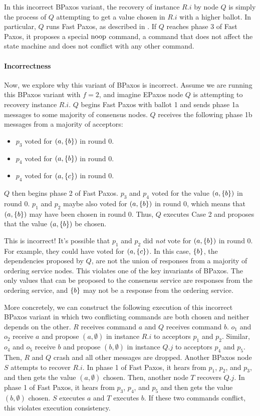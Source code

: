 \documentclass{mwhittaker}
\begin{document}
In this incorrect BPaxos variant, the recovery of instance $R.i$ by node $Q$ is
simply the process of $Q$ attempting to get a value chosen in $R.i$ with a
higher ballot. In particular, $Q$ runs Fast Paxos, as described in
. If $Q$ reaches phase 3 of Fast Paxos, it proposes a special
$\text{noop}$ command, a command that does not affect the state machine and does not
conflict with any other command.

\paragraph{Incorrectness}
Now, we explore why this variant of BPaxos is incorrect. Assume we are running
this BPaxos variant with $f = 2$, and imagine EPaxos node $Q$ is attempting to
recovery instance $R.i$. $Q$ begins Fast Paxos with ballot 1 and sends phase 1a
messages to some majority of consensus nodes. $Q$ receives the following phase
1b messages from a majority of acceptors:
\begin{itemize}
  \item
    $p_3$ voted for $(a, \{b\})$ in round $0$.
  \item
    $p_4$ voted for $(a, \{b\})$ in round $0$.
  \item
    $p_4$ voted for $(a, \{c\})$ in round $0$.
\end{itemize}

$Q$ then begins phase 2 of Fast Paxos. $p_3$ and $p_4$ voted for the value $(a,
\{b\})$ in round $0$. $p_1$ and $p_2$ maybe also voted for $(a, \{b\})$ in
round $0$, which means that $(a, \{b\})$ may have been chosen in round $0$.
Thus, $Q$ executes Case 2 and proposes that the value $(a, \{b\})$ be chosen.

This is incorrect! It's possible that $p_1$ and $p_2$ did \emph{not} vote for
$(a, \{b\})$ in round $0$. For example, they could have voted for $(a,
\{c\})$. In this case, $\{b\}$, the dependencies proposed by $Q$, are not
the union of responses from a majority of ordering service nodes. This violates
one of the key invariants of BPaxos. The only values that can be proposed to
the consensus service are responses from the ordering service, and $\{b\}$
may not be a response from the ordering service.

More concretely, we can construct the following execution of this incorrect
BPaxos variant in which two conflicting commands are both chosen and neither
depends on the other. $R$ receives command $a$ and $Q$ receives command $b$.
$o_1$ and $o_2$ receive $a$ and propose $(a, \emptyset)$ in instance $R.i$ to
acceptors $p_1$ and $p_2$. Similar, $o_4$ and $o_5$ receive $b$ and propose
$(b, \emptyset)$ in instance $Q.j$ to acceptors $p_4$ and $p_5$. Then, $R$ and
$Q$ crash and all other messages are dropped. Another BPaxos node $S$ attempts
to recover $R.i$. In phase 1 of Fast Paxos, it hears from $p_1$, $p_2$, and
$p_3$, and then gets the value $(a, \emptyset)$ chosen. Then, another node $T$
recovers $Q.j$. In phase 1 of Fast Paxos, it hears from $p_3$, $p_4$, and $p_5$
and then gets the value $(b, \emptyset)$ chosen. $S$ executes $a$ and $T$
executes $b$. If these two commands conflict, this violates execution
consistency.
\end{document}
